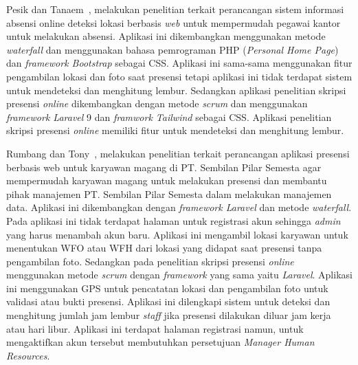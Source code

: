 Pesik dan Tanaem~\cite{pesik2022perancangan}, melakukan penelitian terkait perancangan sistem informasi absensi online deteksi lokasi berbasis \textit{web} untuk mempermudah pegawai kantor untuk melakukan absensi. Aplikasi ini dikembangkan menggunakan metode \textit{waterfall} dan menggunakan bahasa pemrograman PHP (\textit{Personal Home Page}) dan \textit{framework Bootstrap} sebagai CSS. Aplikasi ini sama-sama menggunakan fitur pengambilan lokasi dan foto saat presensi tetapi aplikasi ini tidak terdapat sistem untuk mendeteksi dan menghitung lembur. Sedangkan aplikasi penelitian skripsi presensi \textit{online} dikembangkan dengan metode \textit{scrum} dan menggunakan \textit{framework Laravel} 9 dan \textit{framwork Tailwind} sebagai CSS. Aplikasi penelitian skripsi presensi \textit{online} memiliki fitur untuk mendeteksi dan menghitung lembur.

Rumbang dan Tony~\cite{rumbang2024perancangan}, melakukan penelitian terkait perancangan aplikasi presensi berbasis web untuk
karyawan magang di PT. Sembilan Pilar Semesta agar mempermudah karyawan magang untuk melakukan presensi dan membantu pihak manajemen PT. Sembilan Pilar Semesta dalam melakukan manajemen data. Aplikasi ini dikembangkan dengan \textit{framework Laravel} dan metode \textit{waterfall}. Pada aplikasi ini tidak terdapat halaman untuk registrasi akun sehingga \textit{admin} yang harus menambah akun baru. Aplikasi ini mengambil lokasi karyawan untuk menentukan WFO atau WFH dari lokasi yang didapat saat presensi tanpa pengambilan foto. Sedangkan pada penelitian skripsi presensi \textit{online} menggunakan metode \textit{scrum} dengan \textit{framework} yang sama yaitu \textit{Laravel}. Aplikasi ini menggunakan GPS untuk pencatatan lokasi dan pengambilan foto untuk validasi atau bukti presensi. Aplikasi ini dilengkapi sistem untuk deteksi dan menghitung jumlah jam lembur \textit{staff} jika presensi dilakukan diluar jam kerja atau hari libur. Aplikasi ini terdapat halaman registrasi namun, untuk mengaktifkan akun tersebut membutuhkan persetujuan \textit{Manager Human Resources}.

